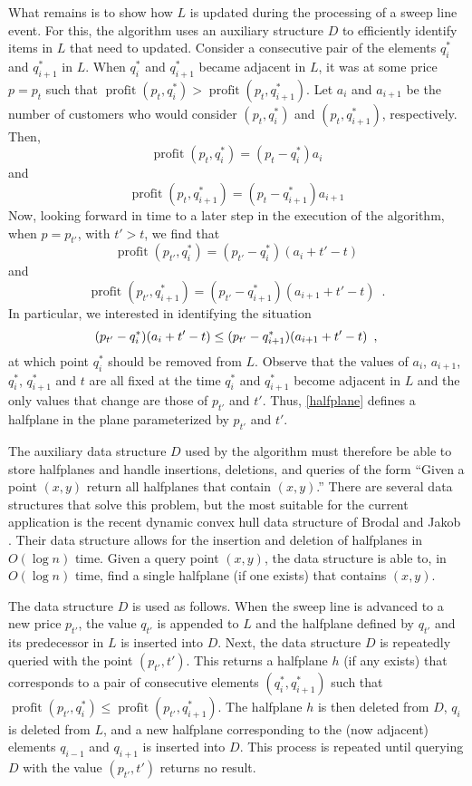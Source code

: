 \documentclass[lotsofwhite]{patmorin}
\newcommand{\val}{\operatorname{profit}}
\begin{document}
What remains is to show how $L$ is updated during the processing
of a sweep line event.  For this, the algorithm uses an auxiliary
structure $D$ to efficiently identify items in $L$ that need to updated.
Consider a consecutive pair of the elements $q^*_i$ and $q^*_{i+1}$
in $L$.  When $q^*_i$ and $q^*_{i+1}$ became adjacent in $L$, it was
at some price $p=p_t$ such that $\val(p_t,q^*_i)>\val(p_t,q^*_{i+1})$.
Let $a_i$ and $a_{i+1}$ be the number of customers who would consider
$(p_t,q^*_i)$ and $(p_t,q^*_{i+1})$, respectively. Then,
\[
  \val(p_t,q^*_i) = (p_t-q^*_i)a_i
\]
and
\[
  \val(p_t,q^*_{i+1}) = (p_t-q^*_{i+1})a_{i+1}
\]
Now, looking forward in time to a later step in the execution of
the algorithm, when $p=p_{t'}$, with $t'> t$, we find that
\[
  \val(p_{t'},q^*_i) = (p_{t'}-q^*_i)(a_i+t'-t)
\]
and
\[
  \val(p_{t'},q^*_{i+1}) = (p_{t'}-q^*_{i+1})(a_{i+1}+t'-t) \enspace .
\]
In particular, we interested in identifying the situation
\begin{equation}
  (p_{t'}-q^*_i)(a_i+t'-t) \le (p_{t'}-q^*_{i+1})(a_{i+1}+t'-t)  \enspace ,
    \eqlabel{halfplane}
\end{equation}
at which point $q^*_i$ should be removed from $L$.  Observe that
the values of $a_i$, $a_{i+1}$, $q^*_i$, $q^*_{i+1}$ and $t$ are all
fixed at the time $q^*_i$ and $q^*_{i+1}$ become adjacent in $L$ and
the only values that change are those of $p_{t'}$ and $t'$.  Thus,
\eqref{halfplane} defines a halfplane in the plane parameterized by
$p_{t'}$ and $t'$.

The auxiliary data structure $D$ used by the algorithm must therefore be
able to store halfplanes and handle insertions, deletions, and queries
of the form ``Given a point $(x,y)$ return all halfplanes that contain
$(x,y)$.'' There are several data structures that solve this problem, but
the most suitable for the current application is the recent dynamic convex
hull data structure of Brodal and Jakob \cite{bjXX}.  Their data structure
allows for the insertion and deletion of halfplanes in $O(\log n)$ time.
Given a query point $(x,y)$, the data structure is able to, in $O(\log
n)$ time, find a single halfplane (if one exists) that contains $(x,y)$.

The data structure $D$ is used as follows.  When the sweep line is
advanced to a new price $p_{t'}$, the value $q_{t'}$ is appended to
$L$ and the halfplane defined by $q_{t'}$ and its predecessor in $L$
is inserted into $D$.  Next, the data structure $D$ is repeatedly
queried with the point $(p_{t'},t')$.  This returns a halfplane
$h$ (if any exists) that corresponds to a pair of consecutive
elements $(q_i^*,q_{i+1}^*)$ such that $\val(p_{t'},q_i^*) \le
\val(p_{t'},q_{i+1}^*)$.  The halfplane $h$ is then deleted from $D$,
$q_{i}$ is deleted from $L$, and a new halfplane corresponding to the
(now adjacent) elements $q_{i-1}$ and $q_{i+1}$ is inserted into $D$.
This process is repeated until querying $D$ with the value $(p_{t'},t')$
returns no result.
\end{document}
